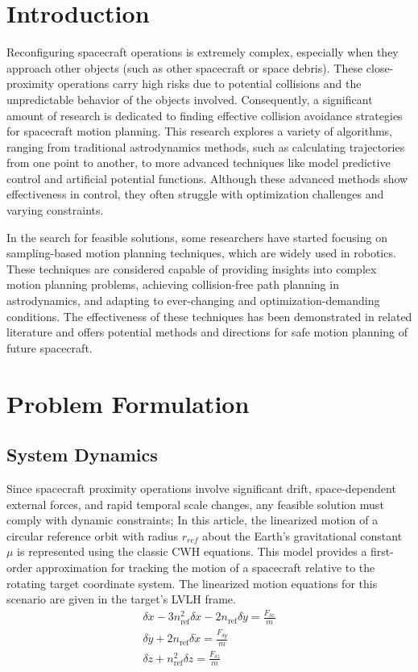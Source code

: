 \documentclass[times,authoryear]{elsarticle}
\begin{document}
\section{Introduction}
Reconfiguring spacecraft operations is extremely complex, especially when they approach other objects (such as other spacecraft or space debris). These close-proximity operations carry high risks due to potential collisions and the unpredictable behavior of the objects involved. Consequently, a significant amount of research is dedicated to finding effective collision avoidance strategies for spacecraft motion planning. This research explores a variety of algorithms, ranging from traditional astrodynamics methods, such as calculating trajectories from one point to another, to more advanced techniques like model predictive control and artificial potential functions. Although these advanced methods show effectiveness in control, they often struggle with optimization challenges and varying constraints.

In the search for feasible solutions, some researchers have started focusing on sampling-based motion planning techniques, which are widely used in robotics. These techniques are considered capable of providing insights into complex motion planning problems, achieving collision-free path planning in astrodynamics, and adapting to ever-changing and optimization-demanding conditions. The effectiveness of these techniques has been demonstrated in related literature and offers potential methods and directions for safe motion planning of future spacecraft.

\section{Problem Formulation}

\subsection{System Dynamics}

Since spacecraft proximity operations involve significant drift, space-dependent external forces, and rapid temporal scale changes, any feasible solution must comply with dynamic constraints; In this article, the linearized motion of a circular reference orbit with radius $r_{ref}$ about the Earth's gravitational constant $\mu$ is represented using the classic CWH equations. This model provides a first-order approximation for tracking the motion of a spacecraft relative to the rotating target coordinate system. The linearized motion equations for this scenario are given in the target's LVLH frame.
\begin{subequations}
	\begin{align}
		\delta\ddot{x}-3n_{\mathrm{ref}}^{2}\delta x-2n_{\mathrm{ref}}\delta\dot{y}=\frac{F_{\delta x}}m \\
		\delta\ddot{y}+2n_{\mathrm{ref}}\delta\dot{x}=\frac{F_{\delta y}}m                               \\
		\delta\ddot{z}+n_{\mathrm{ref}}^{2}\delta z=\frac{F_{\delta z}}m
	\end{align}
\end{subequations}
\end{document}
